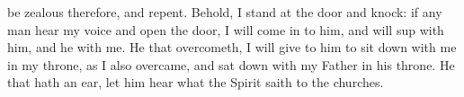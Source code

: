 be zealous therefore, and repent. %
Behold, I stand at the door and knock:%
if any man hear my voice and open the door, I will come in to him, and will sup with him, and he with me. %
He that overcometh, I will give to him to sit down with me in my throne, as I also overcame, and sat down with my Father in his throne. %
He that hath an ear, let him hear what the Spirit saith to the churches.
